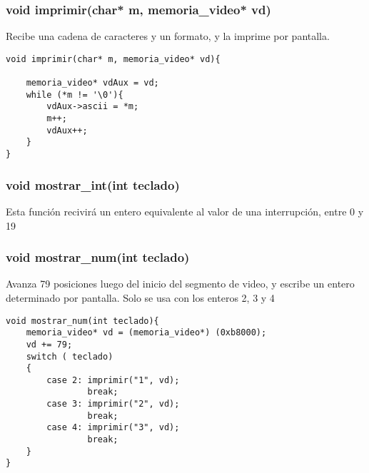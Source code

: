 \subsubsection{void imprimir(char* m, memoria_video* vd)}
Recibe una cadena de caracteres y un formato, y la imprime por pantalla.
\begin{codesnippet}
\begin{verbatim}
void imprimir(char* m, memoria_video* vd){
	
    memoria_video* vdAux = vd;
    while (*m != '\0'){
        vdAux->ascii = *m;
        m++;
        vdAux++;
    }
}
\end{verbatim}
\end{codesnippet}

\subsubsection{void mostrar_int(int teclado)}
Esta funci\'on recivir\'a un entero equivalente al valor de una interrupci\'on, entre 0 y 19

\subsubsection{void mostrar_num(int teclado)}
Avanza 79 posiciones luego del inicio del segmento de video, y escribe un entero determinado por pantalla. Solo se usa con los enteros 2, 3 y 4
\begin{codesnippet}
\begin{verbatim}
void mostrar_num(int teclado){
    memoria_video* vd = (memoria_video*) (0xb8000);
    vd += 79;
    switch ( teclado)
    {
        case 2:	imprimir("1", vd);
                break;
        case 3: imprimir("2", vd);
                break;
        case 4: imprimir("3", vd);
                break;
    }
}
\end{verbatim}
\end{codesnippet}

